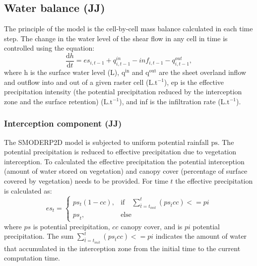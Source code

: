     \subsection{Water balance (JJ)}

    The principle of the model is the cell-by-cell mass balance calculated in
    each time step. The change in the water level of the shear flow in any cell
    in time is controlled using the equation: 
    \begin{equation} 
    \frac{\mathrm{d}h}{\mathrm{d}t} = es_{i,t-1} + q^{in}_{i,t-1} - inf_{i,t-1} - q^{out}_{i,t-1},
    \label{eq:bilance}
    \end{equation}
    where h is the surface water level (L), $\mathrm{q^{in}}$ and
    $\mathrm{q^{out}}$ are the sheet overland inflow and outflow into and out
    of a given raster cell ($\mathrm{L.t^{-1}}$), ep is the effective
    precipitation intensity (the potential precipitation reduced by the
    interception zone and the surface retention) ($\mathrm{L.t^{-1}}$), and inf
    is the infiltration rate ($\mathrm{L.t^{-1}}$).


        \subsubsection{Interception component (JJ)}
            The SMODERP2D model is subjected to uniform potential rainfall
            $\mathrm{ps}$. The potential precipitation is reduced to effective
            precipitation due to vegetation interception.  To calculated the
            effective  precipitation the potential interception (amount of
            water stored on vegetation) and canopy cover (percentage of surface
            covered by vegetation) needs to be provided.  For time $t$ the
            effective precipitation is calculated as:
            $$
            es_t= 
              \begin{cases}
                  ps_t(1 - cc),& \text{if}\quad \sum_{\bar{t} = t_{init}}^{t} (ps_{\bar{t}} cc) <= pi\\
              {ps}_t,             & \text{else}
            \end{cases}
            $$
            where $ps$ is potential precipitation, $cc$ canopy cover, and is
            $pi$ potential precipitation.  The sum $\sum_{\bar{t} =
            t_{init}}^{t} (ps_{\bar{t}} cc) <= pi$ indicates the amount of
            water that accumulated in the interception zone from the initial
            time to the current computation time.
            

